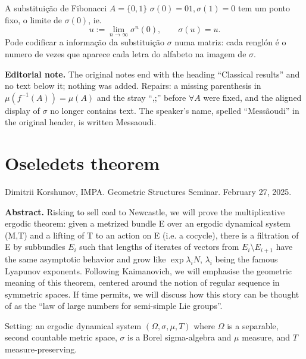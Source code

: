 \begin{remark}
\label{remark-ms-fibonacci}
A substituição de Fibonacci $A=\{0,1\}$
$\sigma(0)=01, \sigma(1)=0$ tem um ponto
fixo, o limite de $\sigma(0)$, ie.
$$
u:=\lim_{n \to \infty} \sigma^n(0),\qquad
\sigma(u)=u.
$$
Pode codificar a informação da substituição
$\sigma$ numa matriz: cada renglón é o numero
de vezes que aparece cada letra do alfabeto
na imagem de $\sigma$.
\end{remark}

\medskip{}

\medskip\noindent
{\bf Editorial note.}
The original notes end with the heading
``Classical results'' and no text below it;
nothing was added. Repairs: a missing
parenthesis in $\mu(f^{-1}(A))=\mu(A)$
and the stray ``,;'' before $\forall A$
were fixed, and
the aligned display of $\sigma$ no longer
contains text. The speaker's name, spelled
``Messãoudi'' in the original header, is
written Messaoudi.

\section{Oseledets theorem}
\label{section-oseledets-theorem}

\noindent
Dimitrii Korshunov, IMPA.
Geometric Structures Seminar.
February 27, 2025.

\medskip\noindent
{\bf Abstract.}
Risking to sell coal to Newcastle, we will
prove the multiplicative ergodic theorem:
given a metrized bundle E over an ergodic
dynamical system (M,T) and a lifting of T to
an action on E (i.e. a cocycle), there is a
filtration of E by subbundles $E_i$ such that
lengths of iterates of vectors from
$E_i\setminus E_{i+1}$ have the same
asymptotic behavior and grow like
$\operatorname{exp}{\lambda_i N}$,
$\lambda_i$ being the famous Lyapunov
exponents. Following Kaimanovich, we will
emphasise the geometric meaning of this
theorem, centered around the notion of
regular sequence in symmetric spaces. If time
permits, we will discuss how this story can
be thought of as the ``law of large numbers
for semi-simple Lie groups''.

\medskip{}
Setting: an ergodic dynamical system
$(\Omega,\sigma,\mu,T)$ where $\Omega$ is a
separable, second countable metric space,
$\sigma$ is a Borel sigma-algebra and $\mu$
measure, and $T$ measure-preserving.

